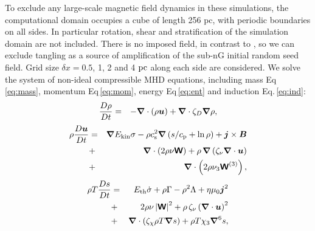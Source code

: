 \documentclass[preprint2]{aastex63}
\newcommand\ESK{E_{\rm kin}}
\newcommand\EST{E_{\rm th}}
\newcommand{\vect}[1]{{{\mbox{\boldmath $#1$}}}}%
\newcommand{\mathbfss}[1]{\textbf{\textsf{#1}}}
\newcommand\pc{~ {\rm pc}}
\begin{document}
To exclude any large-scale magnetic field dynamics in these simulations, the
computational domain occupies a cube of length 256 pc, with periodic boundaries
on all sides.
In particular rotation, shear and stratification of the simulation domain are
not included.
There is no imposed field, in contrast to \citet{BKMM04}, so we can exclude
tangling as a source of amplification of the sub-nG initial random seed field.
Grid size $\delta x=0.5$, 1, 2 and 4$\pc$  along each side are considered.
We solve the system of non-ideal compressible MHD equations, including 
mass Eq\,\eqref{eq:mass}, momentum Eq\,\eqref{eq:mom}, energy Eq\,\eqref{eq:ent} and
induction Eq.\,\eqref{eq:ind}:
  \begin{eqnarray}
  \label{eq:mass}
    \frac{D\rho}{Dt} &=& 
    -\vect\nabla \cdot (\rho \vect{u})
    +\vect\nabla \cdot\zeta_D\vect\nabla\rho,
  \end{eqnarray}
  \begin{eqnarray}
  \label{eq:mom}
    \rho\frac{D\vect{u}}{Dt} &=& 
    \vect\nabla{\ESK\sigma}
    -\rho c_{\rm s}^2\vect\nabla\left({s}/{c_{\rm p}}+\ln\rho\right)
    +\vect{j}\times\vect{B}
    \nonumber\\
    &+&\vect\nabla\cdot \left(2\rho\nu{\mathbfss W}\right)
    +\rho\,\vect\nabla\left(\zeta_{\nu}\vect\nabla \cdot \vect{u} \right)
    \nonumber\\
    &+&\vect\nabla\cdot \left(2\rho\nu_3{\mathbfss W}^{(3)}\right),
  \end{eqnarray}
  \begin{eqnarray}
  \label{eq:ent}
    \rho T\frac{D s}{Dt} &=&
     \EST\dot\sigma +\rho\Gamma
    -\rho^2\Lambda +\eta\mu_0\vect{j}^2 
    \nonumber\\
    &+&2 \rho \nu\left|{\mathbfss W}\right|^{2}
    +\rho\,\zeta_{\nu}\left(\vect\nabla \cdot \vect{u} \right)^2
    \nonumber\\
    &+&\vect\nabla\cdot\left(\zeta_\chi\rho T\vect\nabla s\right)
    +\rho T\chi_3\vect\nabla^6 s,
  \end{eqnarray}
\end{document}

